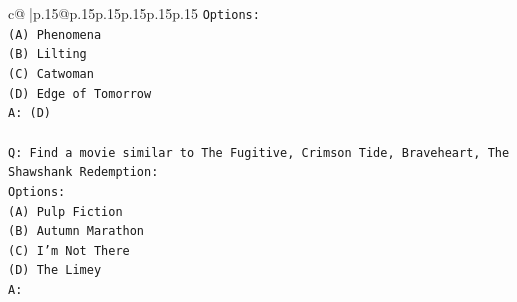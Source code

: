 \documentclass{article}
\begin{document}
{\begin{supertabular}{c@{$\;$}|p{.15\linewidth}@{}p{.15\linewidth}p{.15\linewidth}p{.15\linewidth}p{.15\linewidth}p{.15\linewidth}}
{{{\texttt{Options:} \\
\texttt{(A) Phenomena} \\
\texttt{(B) Lilting} \\
\texttt{(C) Catwoman} \\
\texttt{(D) Edge of Tomorrow} \\
\texttt{A: (D)} \\
\\ 
\texttt{Q: Find a movie similar to The Fugitive, Crimson Tide, Braveheart, The Shawshank Redemption:} \\
\texttt{Options:} \\
\texttt{(A) Pulp Fiction} \\
\texttt{(B) Autumn Marathon} \\
\texttt{(C) I'm Not There} \\
\texttt{(D) The Limey} \\
\texttt{A:} \\
            }
        }
    }
     \\ \\


\end{supertabular}}
\end{document}
